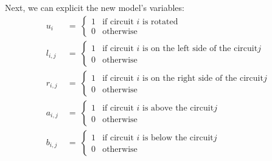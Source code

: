     Next, we can explicit the new model's variables:
    \begin{align*}
        u_i\    &\ =\ \begin{cases}
                              1 & \text{if circuit } i \text{ is rotated}                           \\
                              0 & \text{otherwise}
                          \end{cases}                                                               \\
        l_{i,j} &\ =\ \begin{cases}
                              1 & \text{if circuit } i \text{ is on the left side of the circuit} j \\
                              0 & \text{otherwise}
                          \end{cases}                                                               \\
        r_{i,j} &\ =\ \begin{cases}
                            1 & \text{if circuit } i \text{ is on the right side of the circuit} j  \\
                            0 & \text{otherwise}
                        \end{cases}                                                                 \\
        a_{i,j} &\ =\ \begin{cases}
                            1 & \text{if circuit } i \text{ is above the circuit} j                 \\
                            0 & \text{otherwise}
                        \end{cases}                                                                 \\
        b_{i,j} &\ =\ \begin{cases}
                            1 & \text{if circuit } i \text{ is below the circuit} j                 \\
                            0 & \text{otherwise}
                        \end{cases}
    \end{align*}

